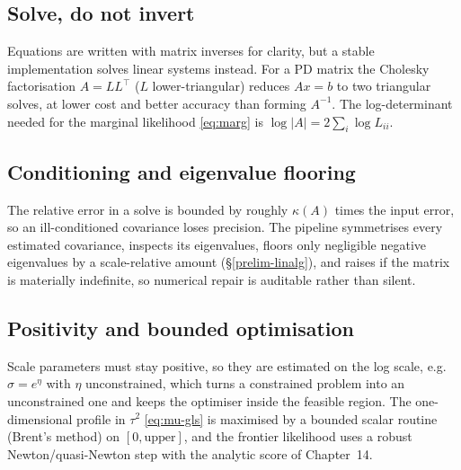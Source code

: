 \subsection{Solve, do not invert}

Equations are written with matrix inverses for clarity, but a stable
implementation solves linear systems instead. For a PD matrix the Cholesky
factorisation $A=LL^{\top}$ ($L$ lower-triangular) reduces $Ax=b$ to two
triangular solves, at lower cost and better accuracy than forming
$A^{-1}$. The log-determinant needed for the marginal likelihood
\eqref{eq:marg} is $\log\lvert A\rvert=2\sum_i\log L_{ii}$.

\subsection{Conditioning and eigenvalue flooring}

The relative error in a solve is bounded by roughly $\kappa(A)$ times the
input error, so an ill-conditioned covariance loses precision. The pipeline
symmetrises every estimated covariance, inspects its eigenvalues, floors
only negligible negative eigenvalues by a scale-relative amount
(\S\ref{prelim-linalg}), and raises if the matrix is materially indefinite,
so numerical repair is auditable rather than silent.

\subsection{Positivity and bounded optimisation}

Scale parameters must stay positive, so they are estimated on the log
scale, e.g.\ $\sigma=e^{\eta}$ with $\eta$ unconstrained, which turns a
constrained problem into an unconstrained one and keeps the optimiser
inside the feasible region. The one-dimensional profile in $\tau^2$
\eqref{eq:mu-gls} is maximised by a bounded scalar routine (Brent's method)
on $[0,\text{upper}]$, and the frontier likelihood uses a robust
Newton/quasi-Newton step with the analytic score of Chapter~14.

